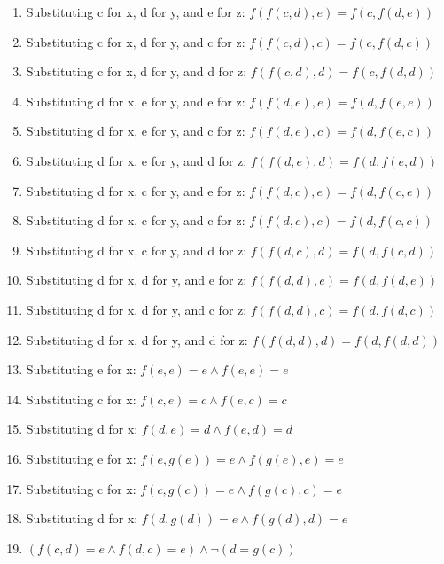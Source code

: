 \documentclass[12pt]{article}
\begin{document}
\begin{enumerate}
    \item Substituting c for x, d for y, and e for z:
    $f(f(c,d),e) = f(c,f(d,e))$
    
    \item Substituting c for x, d for y, and c for z:
    $f(f(c,d),c) = f(c,f(d,c))$
    
    \item Substituting c for x, d for y, and d for z:
    $f(f(c,d),d) = f(c,f(d,d))$
    
    \item Substituting d for x, e for y, and e for z:
    $f(f(d,e),e) = f(d,f(e,e))$
    
    \item Substituting d for x, e for y, and c for z:
    $f(f(d,e),c) = f(d,f(e,c))$
    
    \item Substituting d for x, e for y, and d for z:
    $f(f(d,e),d) = f(d,f(e,d))$
    
    \item Substituting d for x, c for y, and e for z:
    $f(f(d,c),e) = f(d,f(c,e))$
    
    \item Substituting d for x, c for y, and c for z:
    $f(f(d,c),c) = f(d,f(c,c))$
    
    \item Substituting d for x, c for y, and d for z:
    $f(f(d,c),d) = f(d,f(c,d))$
    
    \item Substituting d for x, d for y, and e for z:
    $f(f(d,d),e) = f(d,f(d,e))$

    \item Substituting d for x, d for y, and c for z:
    $f(f(d,d),c) = f(d,f(d,c))$

    \item Substituting d for x, d for y, and d for z:
    $f(f(d,d),d) = f(d,f(d,d))$

    \item Substituting e for x:
    $f(e,e) = e \land f(e,e) = e$
    
    \item Substituting c for x:
    $f(c,e) = c \land f(e,c) = c$
    
    \item Substituting d for x:
    $f(d,e) = d \land f(e,d) = d$
    
    \item Substituting e for x:
    $f(e, g(e)) = e \land f(g(e),e) = e$

    \item Substituting c for x:
    $f(c, g(c)) = e \land f(g(c),c) = e$

    \item Substituting d for x:
    $f(d, g(d)) = e \land f(g(d),d) = e$

    \item $(f(c,d) = e \land f(d,c) = e) \land \neg(d = g(c))$
    
\end{enumerate}
\end{document}
